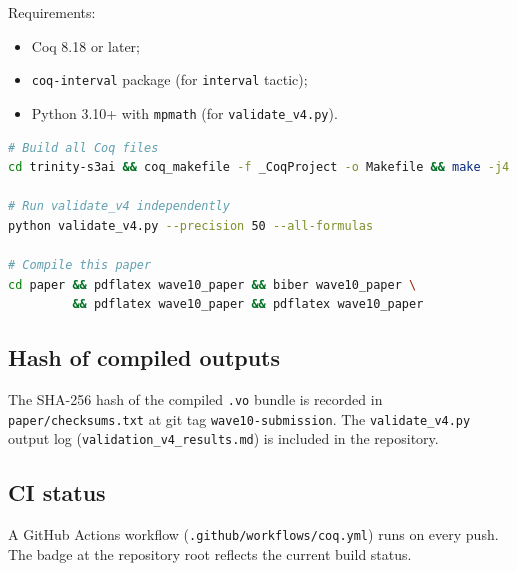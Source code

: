\documentclass[12pt,a4paper]{article}
\begin{document}
Requirements:
\begin{itemize}
  \item Coq 8.18 or later;
  \item \texttt{coq-interval} package (for \texttt{interval} tactic);
  \item Python 3.10+ with \texttt{mpmath} (for \texttt{validate\_v4.py}).
\end{itemize}

\begin{lstlisting}[language=bash, caption={Compilation commands}]
# Build all Coq files
cd trinity-s3ai && coq_makefile -f _CoqProject -o Makefile && make -j4

# Run validate_v4 independently
python validate_v4.py --precision 50 --all-formulas

# Compile this paper
cd paper && pdflatex wave10_paper && biber wave10_paper \
         && pdflatex wave10_paper && pdflatex wave10_paper
\end{lstlisting}

\subsection{Hash of compiled outputs}

The SHA-256 hash of the compiled \texttt{.vo} bundle is recorded in
\texttt{paper/checksums.txt} at git tag \texttt{wave10-submission}.
The \texttt{validate\_v4.py} output log (\texttt{validation\_v4\_results.md})
is included in the repository.

\subsection{CI status}

A GitHub Actions workflow (\texttt{.github/workflows/coq.yml}) runs on every push.
The badge at the repository root reflects the current build status.
\end{document}

